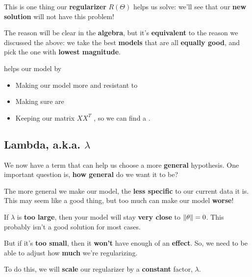         This is one thing our \textbf{regularizer} $R(\Theta)$ helps us solve: we'll see that our \textbf{new solution} will not have this problem! 
        
        The reason will be clear in the \textbf{algebra}, but it's \textbf{equivalent} to the reason we discussed the above: we take the best \textbf{models} that are all \textbf{equally good}, and pick the one with \textbf{lowest magnitude}.\\
        
        \begin{concept}
             helps  our model by
            
            \begin{itemize}
                \item Making our model more  and resistant to 
                \item Making sure  are 
                \item Keeping our matrix $XX^T$ , so we can find a .
            \end{itemize}
        \end{concept}
        
    \subsection{Lambda, a.k.a. $\lambda$}
    
        We now have a term that can help us choose a more \textbf{general} hypothesis. One important question is, \textbf{how general} do we want it to be?
        
        The more general we make our model, the \textbf{less specific} to our current data it is. This may seem like a good thing, but too much can make our model \textbf{worse}!
        
        If $\lambda$ is \textbf{too large}, then your model will stay \textbf{very close} to $\left\lVert\theta\right\rVert=0$. This probably isn't a good solution for most cases.
        
        
        But if it's \textbf{too small}, then it \textbf{won't} have enough of an \textbf{effect}. So, we need to be able to adjust how \textbf{much} we're regularizing.
        
        To do this, we will \textbf{scale} our regularizer by a \textbf{constant} factor, $\lambda$.\\
        

